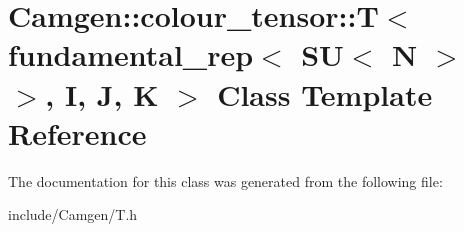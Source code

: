 \hypertarget{a00537}{}\section{Camgen\+:\+:colour\+\_\+tensor\+:\+:T$<$ fundamental\+\_\+rep$<$ S\+U$<$ N $>$ $>$, I, J, K $>$ Class Template Reference}
\label{a00537}


The documentation for this class was generated from the following file\+:\begin{DoxyCompactItemize}
\item 
include/\+Camgen/T.\+h\end{DoxyCompactItemize}
